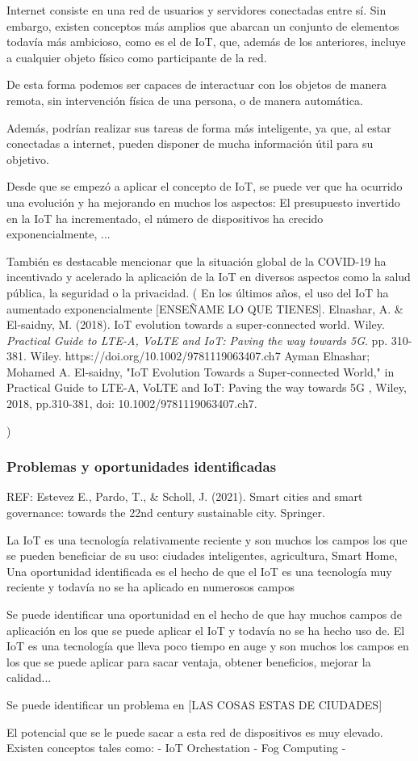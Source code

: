 \documentclass[12pt, a4paper, twoside]{article}
\begin{document}
Internet consiste en una red de usuarios y servidores conectadas entre sí.
Sin embargo, existen conceptos más amplios que abarcan un conjunto de elementos todavía más ambicioso,
como es el de IoT, que, además de los anteriores, incluye a cualquier objeto físico como participante de la red.

De esta forma podemos ser capaces de interactuar con los objetos de manera remota, sin intervención física de
una persona, o de manera automática.

Además, podrían realizar sus tareas de forma más inteligente, ya que, al estar conectadas a internet, pueden
disponer de mucha información útil para su objetivo.

Desde que se empezó a aplicar el concepto de IoT, se puede ver que ha ocurrido una evolución y ha mejorando en
muchos los aspectos: El presupuesto invertido en la IoT ha incrementado, el número de dispositivos ha crecido
exponencialmente, ...

También es destacable mencionar que la situación global de la COVID-19 ha incentivado y acelerado la aplicación
de la IoT en diversos aspectos como la salud pública, la seguridad o la privacidad.
(
En los últimos años, el uso del IoT ha aumentado exponencialmente [ENSEÑAME LO QUE TIENES].
Elnashar, A. \& El-saidny, M. (2018). IoT evolution towards a super-connected world. Wiley. \textit{Practical Guide to LTE-A, VoLTE and IoT: Paving the way towards 5G}. pp. 310-381. Wiley. https://doi.org/10.1002/9781119063407.ch7
Ayman Elnashar; Mohamed A. El-saidny, "IoT Evolution Towards a Super‐connected World," in Practical Guide to LTE-A, VoLTE and IoT: Paving the way towards 5G , Wiley, 2018, pp.310-381, doi: 10.1002/9781119063407.ch7.




)
\subsubsection{Problemas y oportunidades identificadas}
REF: 
Estevez E., Pardo, T., \& Scholl, J. (2021). Smart cities and smart governance: towards the 22nd century sustainable city. Springer.

La IoT es una tecnología relativamente reciente y son muchos los campos los que se pueden beneficiar de su uso:
ciudades inteligentes, agricultura, Smart Home, 
Una oportunidad identificada es el hecho de que el IoT es una tecnología muy reciente y todavía
no se ha aplicado en numerosos campos 

Se puede identificar una oportunidad en el hecho de que hay muchos campos de aplicación en los que se
puede aplicar el IoT y todavía no se ha hecho uso de.
El IoT es una tecnología que lleva poco tiempo en auge y son muchos los campos en los que se puede 
aplicar para sacar ventaja, obtener beneficios, mejorar la calidad...

Se puede identificar un problema en [LAS COSAS ESTAS DE CIUDADES]

El potencial que se le puede sacar a esta red de dispositivos es muy elevado. Existen conceptos tales como:
 - IoT Orchestation
 - Fog Computing
 - 
\end{document}
